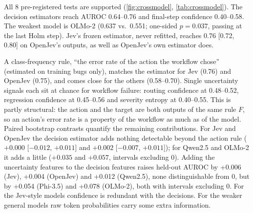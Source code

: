  All 8 pre-registered tests are supported
(\cref{fig:crossmodel}, \cref{tab:crossmodel}). The decision estimators
reach AUROC 0.64--0.76 and final-step confidence 0.40--0.58. The weakest
model is OLMo-2 (0.637 vs.\ 0.551; one-sided $p = 0.037$, passing at the
last Holm step). Jev's frozen estimator, never refitted, reaches 0.76
[0.72, 0.80] on OpenJev's outputs, as well as OpenJev's own estimator
does.

\begin{widetable}
\centering
\caption{Per-model results on the same 500 held-out bugs. AUROC columns
rank wrong workflow actions (95\% bootstrap CI): the decision-feature
estimator fitted on each model's own training outputs, the model's
final-step confidence, the action-conditional error-rate rule, and Jev's
frozen estimator applied unchanged. Cost columns are from the
pre-registered intervention test (\cref{sec:intervention}); the oracle
is an upper bound that must spend all 50 reviews, and ``wrong accepts''
is their share of no-review cost. Absolute failure rates are not a clean
quality comparison, because the Jev-style and general models use
different interfaces.}
\label{tab:crossmodel}
\resizebox{\textwidth}{!}{}
\end{widetable}

 A class-frequency
rule, ``the error rate of the action the workflow chose'' (estimated on training
bugs only), matches the estimator for Jev (0.76) and OpenJev (0.75), and
comes close for the others (0.58--0.70). Single uncertainty signals each
sit at chance for workflow failure: routing confidence at 0.48--0.52,
regression confidence at 0.45--0.56 and severity entropy at 0.40--0.55.
This is partly structural: the action and the target are both outputs of
the same rule $F$, so an action's error rate is a property of the
workflow as much as of the model. Paired bootstrap contrasts quantify
the remaining contributions. For Jev and OpenJev the
decision estimator adds nothing detectable beyond the action rule
($+0.000$ [$-0.012$, $+0.011$] and $+0.002$ [$-0.007$, $+0.011$]); for
Qwen2.5 and OLMo-2 it adds a little ($+0.035$ and $+0.057$, intervals
excluding 0). Adding the uncertainty features to the decision features
raises held-out AUROC by +0.006 (Jev), +0.004 (OpenJev) and +0.012
(Qwen2.5), none distinguishable from 0, but by +0.054 (Phi-3.5) and +0.078
(OLMo-2), both with intervals excluding 0. For the Jev-style models
confidence is redundant with the decisions. For the weaker general models
raw token probabilities carry some extra information.

